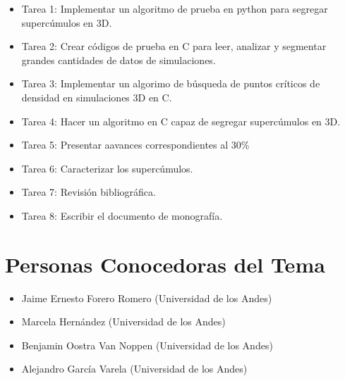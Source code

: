 \documentclass[12pt]{article}
\begin{document}
\begin{itemize}
	\item Tarea 1: Implementar un algoritmo de prueba en python para segregar  supercúmulos en 3D.
	\item Tarea 2: Crear códigos de prueba en C para leer, analizar y segmentar grandes cantidades de datos de simulaciones.
    
	\item Tarea 3: Implementar un algorimo de búsqueda de puntos críticos de densidad en simulaciones 3D en C.
	\item Tarea 4: Hacer un algoritmo en C capaz de segregar supercúmulos en 3D.
    \item Tarea 5: Presentar aavances correspondientes al 30\%
    \item Tarea 6: Caracterizar los supercúmulos.
    \item Tarea 7: Revisión bibliográfica.
    \item Tarea 8: Escribir el documento de monografía.
    
    
\end{itemize}

\section{Personas Conocedoras del Tema}


\begin{itemize}
	\item Jaime Ernesto Forero Romero (Universidad de los Andes)
    \item Marcela Hern\'andez (Universidad de los Andes)
	\item Benjamin Oostra Van Noppen (Universidad de los Andes)
	\item Alejandro García Varela (Universidad de los Andes)
\end{itemize}
\end{document}
